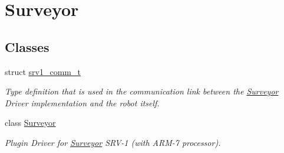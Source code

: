 \hypertarget{group__driver__surveyor}{
\section{Surveyor}
\label{group__driver__surveyor}
}
\subsection*{Classes}
\begin{CompactItemize}
\item 
struct \hyperlink{structsrv1__comm__t}{srv1\_\-comm\_\-t}
\begin{CompactList}\small\item\em Type definition that is used in the communication link between the \hyperlink{classSurveyor}{Surveyor} Driver implementation and the robot itself. \item\end{CompactList}\item 
class \hyperlink{classSurveyor}{Surveyor}
\begin{CompactList}\small\item\em Plugin Driver for \hyperlink{classSurveyor}{Surveyor} SRV-1 (with ARM-7 processor). \item\end{CompactList}\end{CompactItemize}
